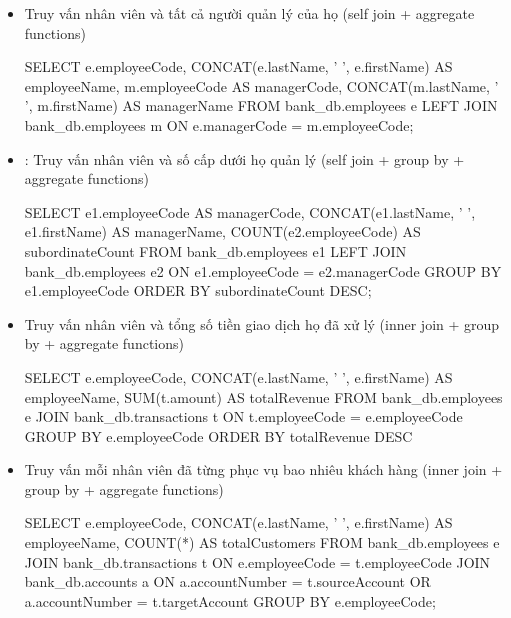 \begin{itemize}

   \item Truy vấn nhân viên và tất cả người quản lý của họ (self join + aggregate functions)
    \begin{MySQLCode}
    SELECT 
        e.employeeCode,
        CONCAT(e.lastName, ' ', e.firstName) AS employeeName,
        m.employeeCode AS managerCode,
        CONCAT(m.lastName, ' ', m.firstName) AS managerName
    FROM 
        bank_db.employees e
    LEFT JOIN 
        bank_db.employees m ON e.managerCode = m.employeeCode;
    \end{MySQLCode}

    \item : Truy vấn nhân viên và số cấp dưới họ quản lý (self join + group by + aggregate functions)
    \begin{MySQLCode}
    SELECT 
        e1.employeeCode AS managerCode,
        CONCAT(e1.lastName, ' ', e1.firstName) AS managerName,
        COUNT(e2.employeeCode) AS subordinateCount
    FROM 
        bank_db.employees e1
    LEFT JOIN 
        bank_db.employees e2 ON e1.employeeCode = e2.managerCode
    GROUP BY 
        e1.employeeCode
    ORDER BY 
        subordinateCount DESC;
    \end{MySQLCode}

    \item Truy vấn nhân viên và tổng số tiền giao dịch họ đã xử lý (inner join + group by + aggregate functions)
    \begin{MySQLCode}
    SELECT 
        e.employeeCode,
        CONCAT(e.lastName, ' ', e.firstName) AS employeeName,
	   SUM(t.amount) AS totalRevenue
    FROM 
        bank_db.employees e
    JOIN 
        bank_db.transactions t ON t.employeeCode = e.employeeCode
    GROUP BY 
        e.employeeCode
    ORDER BY 
        totalRevenue DESC
    \end{MySQLCode}

    \item Truy vấn mỗi nhân viên đã từng phục vụ bao nhiêu khách hàng (inner join + group by + aggregate functions)
    \begin{MySQLCode}
    SELECT 
        e.employeeCode,
        CONCAT(e.lastName, ' ', e.firstName) AS employeeName,
        COUNT(*) AS totalCustomers
    FROM
	   bank_db.employees e
    JOIN
        bank_db.transactions t ON e.employeeCode = t.employeeCode
    JOIN 
        bank_db.accounts a ON a.accountNumber = t.sourceAccount OR a.accountNumber = t.targetAccount
    GROUP BY 
        e.employeeCode;
    \end{MySQLCode}

\end{itemize}
